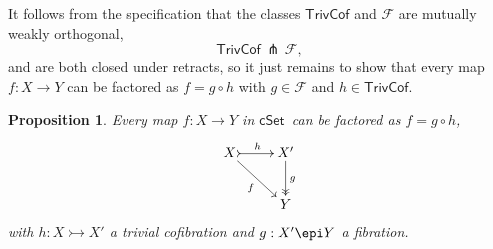 \documentclass[11pt]{article}
\newcommand{\cSet}{\ensuremath{\mathsf{cSet}}}
\newcommand{\mono}{\ensuremath{\rightarrowtail}}
\newtheorem{proposition}[theorem]{Proposition}
\theoremstyle{remark}
\theoremstyle{definition}
\begin{document}
It follows from the specification that the classes $\mathsf{TrivCof}$ and $\mathcal{F}$ are mutually weakly orthogonal,
\[
\mathsf{TrivCof}\, {\pitchfork}\, \mathcal{F},
\]
and are both closed under retracts, so it just remains to show that every map $f: X\to Y$ can be factored as $f  = g\circ h$ with $g\in \mathcal{F}$ and $h\in \mathsf{TrivCof}$.

\begin{proposition}
Every map $f: X\to Y$ in \cSet\ can be factored as $f  = g\circ h$,
\begin{equation}%
\xymatrix{
X \ar[rd]_{f} \ar@{>->}[r]^h & X'\ar@{->>}[d]^g\\
& Y
}
\end{equation}
with $h: X\mono X'$ a trivial cofibration and $g: X'\epi Y$ a fibration.
\end{proposition}
\end{document}
